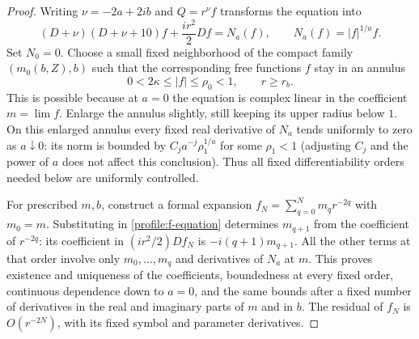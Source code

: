 \begin{proof}
Writing $\nu=-2a+2ib$ and $Q=r^\nu f$ transforms the equation into
\begin{equation}\label{profile:f-equation}
 (D+\nu)(D+\nu+10)f+\frac{ir^2}{2}Df=N_a(f),
       \qquad N_a(f)=|f|^{1/a}f.
\end{equation}
Set $N_0=0$.  Choose a small fixed neighborhood of the compact family
$(m_0(b,Z),b)$ such that the corresponding free functions $f$ stay in
an annulus
\begin{equation}\label{profile:annulus}
 0<2\kappa\le|f|\le\rho_0<1,\qquad r\ge r_b.
\end{equation}
This is possible because at $a=0$ the equation is complex linear in the
coefficient $m=\lim f$.  Enlarge the annulus slightly, still keeping its
upper radius below $1$.  On this enlarged annulus every fixed real
derivative of $N_a$ tends uniformly to zero as $a\downarrow0$: its norm
is bounded by $C_j a^{-j}\rho_1^{1/a}$ for some $\rho_1<1$ (adjusting
$C_j$ and the power of $a$ does not affect this conclusion).  Thus all
fixed differentiability orders needed below are uniformly controlled.

For prescribed $m,b$, construct a formal expansion
$f_N=\sum_{q=0}^Nm_qr^{-2q}$ with $m_0=m$.  Substituting in
\eqref{profile:f-equation} determines $m_{q+1}$ from the coefficient of
$r^{-2q}$: its coefficient in $(ir^2/2)Df_N$ is $-i(q+1)m_{q+1}$.
All the other terms at that order involve only $m_0,\ldots,m_q$ and
derivatives of $N_a$ at $m$.  This proves existence and uniqueness of
the coefficients, boundedness at every fixed order, continuous
dependence down to $a=0$, and the same bounds after a fixed number of
derivatives in the real and imaginary parts of $m$ and in $b$.
The residual of $f_N$ is $O(r^{-2N})$, with its fixed symbol and
parameter derivatives.


\end{proof}
